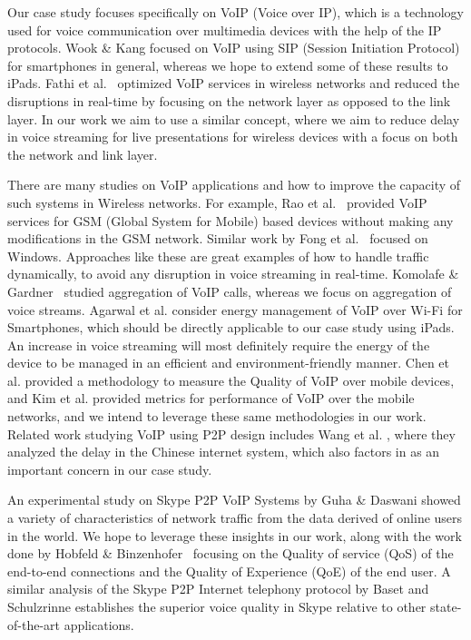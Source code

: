 Our case study focuses specifically on VoIP (Voice over IP), which is a
technology used for voice communication over multimedia devices with the help of
the IP protocols. Wook \& Kang \cite{HS_VoIP_ICTC10} focused on VoIP using SIP
(Session
Initiation
Protocol) for smartphones in general, whereas we hope to extend some of these
results to iPads.  Fathi et al.~\cite{HSR_VoIP_TVT07} optimized VoIP services
in wireless networks
and reduced the disruptions in real-time by focusing on the network layer as
opposed to the link layer.   In our work we aim to use a similar concept, where
we aim to reduce delay in voice streaming for live presentations for wireless
devices with a focus on both the network and link layer.

There are many studies on VoIP applications and how to improve the capacity of
such systems in Wireless networks.  For example, Rao et
al.~\cite{HYS_VoIP_COM00} provided VoIP
services for GSM (Global System for Mobile) based devices without making any
modifications in the GSM network.  Similar work by Fong et
al.~\cite{MRSR_VoIP_COM08} focused on
Windows.  Approaches like these are great examples of how to handle traffic
dynamically, to avoid any disruption in voice streaming in real-time. Komolafe
\& Gardner~\cite{OR_VoIP_PMC03} studied aggregation of VoIP calls, whereas we
focus on aggregation of voice streams. Agarwal et al. \cite{YRAP_VoIP_MSYS07} consider energy
management of VoIP over Wi-Fi for Smartphones, which should be directly applicable to our case study
using iPads.  An increase in voice streaming will most definitely require the
energy of the device to be managed in an efficient and environment-friendly
manner.   Chen et al. \cite{WPY_VoIP_SYS11} provided a methodology to measure the
Quality of VoIP
over mobile devices, and Kim et al. \cite{DHMS_WiMAX_WOW08} provided metrics for
performance of VoIP
over the mobile networks, and we intend to leverage these same methodologies in
our work.  Related work studying VoIP using P2P design includes Wang et al.
\cite{GCXZ_P2PVoIP_MTA13}, where they analyzed the delay in the Chinese internet
system, which also
factors in as an important concern in our case study.

An experimental study on Skype P2P VoIP Systems by Guha \& Daswani
\cite{SN_Skype_CIST05} showed a variety of characteristics of network traffic from 
the data derived of online users in the world.  
We hope to leverage these insights in our work, along with the
work done by  Hobfeld \& Binzenhofer~\cite{TA_Skype_COMPNET08} focusing on the Quality
of service (QoS) of the end-to-end connections and the Quality of Experience
(QoE) of the end user. A
similar analysis of the Skype P2P Internet telephony protocol by Baset and
Schulzrinne \cite{SH_Skype_INFO06} establishes the superior voice quality in
Skype relative to
other state-of-the-art applications.

